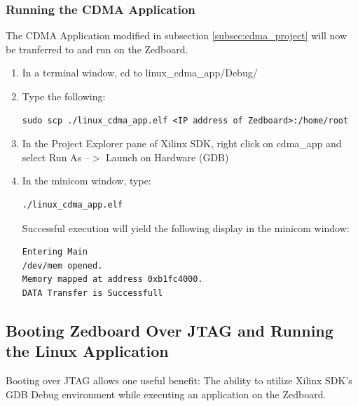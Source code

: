 \documentclass[12pt]{article}
\begin{document}
\subsubsection{Running the CDMA Application}
The CDMA Application modified in subsection \ref{subsec:cdma_project} will now be tranferred to and run on the Zedboard.
\begin{enumerate}
\item In a terminal window, cd to linux\_cdma\_app/Debug/ 
\item Type the following:
\begin{lstlisting}
sudo scp ./linux_cdma_app.elf <IP address of Zedboard>:/home/root
\end{lstlisting}
\item In the Project Explorer pane of Xilinx SDK, right click on cdma\_app and select Run As --$>$ Launch on Hardware (GDB)
\item In the minicom window, type:
\begin{lstlisting}
./linux_cdma_app.elf
\end{lstlisting}
Successful execution will yield the following display in the minicom window:
\begin{lstlisting}
Entering Main                                                                   
/dev/mem opened.                                                                
Memory mapped at address 0xb1fc4000.                                            
DATA Transfer is Successfull 
\end{lstlisting}
\end{enumerate}

\subsection{Booting Zedboard Over JTAG and Running the Linux Application}
Booting over JTAG allows one useful benefit: The ability to utilize Xilinx SDK's GDB Debug environment while executing an application on the Zedboard.  
\end{document}
